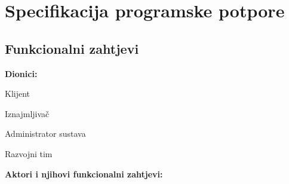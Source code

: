 \chapter{Specifikacija programske potpore}
		
	\section{Funkcionalni zahtjevi}
			
			
			
			\noindent \textbf{Dionici:}
			
			\begin{packed_enum}
				
				\item Klijent
				\item Iznajmljivač			
				\item Administrator sustava
				\item Razvojni tim 
				
			\end{packed_enum}
			
			\noindent \textbf{Aktori i njihovi funkcionalni zahtjevi:}
			
